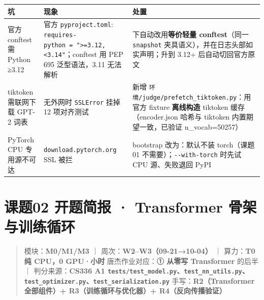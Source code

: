 \documentclass[
  chinese,
  11pt,
]{ctexart}
\newcounter{none} %
\begin{document}
{\def\LTcaptype{none} %
\begin{longtable}[]{@{}
  >{\raggedright\arraybackslash}p{}
  >{\raggedright\arraybackslash}p{}
  >{\raggedright\arraybackslash}p{}@{}}
\toprule\noalign{}
\begin{minipage}[b]{\linewidth}\raggedright
坑
\end{minipage} & \begin{minipage}[b]{\linewidth}\raggedright
现象
\end{minipage} & \begin{minipage}[b]{\linewidth}\raggedright
处置
\end{minipage} \\
\midrule\noalign{}
\endhead
\bottomrule\noalign{}
\endlastfoot
官方 conftest 需 Python ≥3.12 & 官方 \texttt{pyproject.toml}: \texttt{requires-python\ =\ "\textgreater{}=3.12,\textless{}3.14"}；conftest 用 PEP 695 泛型语法，3.11 无法解析 & 3.11 下自动改用\textbf{等价轻量 conftest}（同一 \texttt{snapshot} 夹具语义），并在日志头部如实声明；升到 3.12+ 后自动切回官方原文 \\
tiktoken 需联网下载 GPT-2 词表 & 无外网时 \texttt{SSLError} 挂掉 12 项对齐测试 & 新增 \texttt{环境/judge/prefetch\_tiktoken.py}：用官方 fixture \textbf{离线构造} tiktoken 缓存（encoder.json 哈希与 tiktoken 内置期望一致，已验证 n\_vocab=50257） \\
PyTorch CPU 专用源不可达 & \texttt{download.pytorch.org} SSL 被拦 & bootstrap 改为：默认不装 torch（课题01 不需要）；\texttt{-\/-with-torch} 时先试 CPU 源、失败退回 PyPI \\
\end{longtable}
}

\newpage

\section{课题02 开题简报 · Transformer 骨架与训练循环}\label{ux8bfeux989802-ux5f00ux9898ux7b80ux62a5-transformer-ux9aa8ux67b6ux4e0eux8badux7ec3ux5faaux73af}

\begin{quote}
模块：\textbf{M0/M1/M3} ｜ 周次：\textbf{W2--W3（09-21→10-04）} ｜ 算力：\textbf{T0 纯 CPU，0 GPU·小时} 唐杰作业对应：\textbf{① 从零写 Transformer} 的后半 ｜ 判分来源：\textbf{CS336 A1 \texttt{tests/test\_model.py}、\texttt{test\_nn\_utils.py}、\texttt{test\_optimizer.py}、\texttt{test\_serialization.py}} 手写：\textbf{R2（Transformer 全部组件）+ R3（训练循环与优化器）+ R4（反向传播验证）}
\end{quote}
\end{document}
